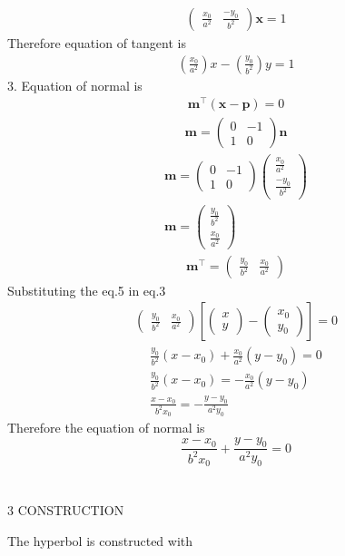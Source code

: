 \documentclass[a4paper,10pt]{report}
\newcommand{\myvec}[1]{\ensuremath{\begin{pmatrix}#1\end{pmatrix}}}
\let\vec\mathbf
\providecommand{\sbrak}[1]{\ensuremath{{}\left[#1\right]}}
\begin{document}
\begin{multicols}{2}
\begin{align}
\myvec{\frac{x_0}{a^{2}} & \frac{-y_0}{b^{2}}}\vec{x} = 1 
\end{align}
Therefore equation of tangent is \begin{align}
 \left( \frac{x_0}{a^{2}} \right)x - \left(\frac{y_0}{b^{2}}\right)y = 1 
\end{align}
3. Equation of normal is 
\begin{gather}
\vec{m}^{\top}(\vec{x-p}) = 0
\end{gather}
\begin{gather}
\vec{m} = \myvec{0 & -1 \\ 1 & 0}\vec{n}
\end{gather}
\begin{gather*}
\vec{m} = \myvec{0 & -1 \\ 1 & 0}\myvec{\frac{x_0}{a^{2}} \\ \frac{-y_0}{b^{2}}}\\
\vec{m} = \myvec{\frac{y_0}{b^{2}} \\ \frac{x_0}{a^{2}}} 
\end{gather*}
\begin{gather}
\vec{m}^{\top} = \myvec{\frac{y_0}{b^{2}} & \frac{x_0}{a^{2}}}
\end{gather}
Substituting the eq.5 in eq.3
\begin{gather}
\myvec{\frac{y_0}{b^{2}} & \frac{x_0}{a^{2}}}  \sbrak{\myvec{x \\ y} - \myvec{x_0 \\ y_0}} = 0
\end{gather}
\begin{gather*}
\frac{y_0}{b^{2}}(x-x_0) + \frac{x_0}{a^{2}}(y-y_0) = 0 \\
\frac{y_0}{b^{2}}(x-x_0) = -\frac{x_0}{a^{2}}(y-y_0) \\
\frac{x-x_0}{b^{2}x_0} = -\frac{y-y_0}{a^{2}y_0}
\end{gather*}
Therefore the equation of normal is $$\frac{x-x_0}{b^{2}x_0}+\frac{y-y_0}{a^{2}y_0} = 0 $$ 
	\vspace{2mm}\\
\vspace{2mm}\\
\centering \large\textsc{3  C}\footnotesize\textsc{ONSTRUCTION}\vspace{5mm}\\
\raggedright\large{The hyperbol is constructed with } 
\begin{center}
    \label{tab:truthtable}
    \setlength{\arrayrulewidth}{0.2mm}
\setlength{\tabcolsep}{5pt}

\end{center}
\end{multicols}
\end{document}
